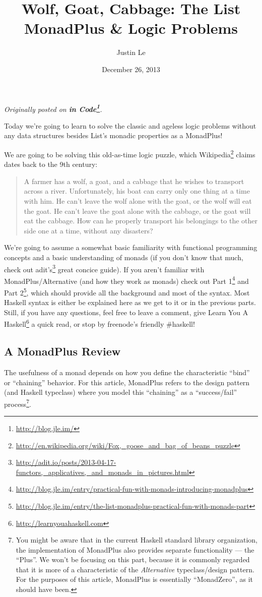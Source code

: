 \documentclass[]{article}
\title{Wolf, Goat, Cabbage: The List MonadPlus \& Logic Problems}
\author{Justin Le}
\date{December 26, 2013}
\renewcommand{\href}[2]{#2\footnote{\url{#1}}}
\begin{document}
\maketitle

\emph{Originally posted on \textbf{\href{http://blog.jle.im/}{in
Code}}.}

Today we're going to learn to solve the classic and ageless logic
problems without any data structures besides List's monadic properties
as a MonadPlus!

We are going to be solving this old-as-time logic puzzle, which
\href{http://en.wikipedia.org/wiki/Fox,_goose_and_bag_of_beans_puzzle}{Wikipedia}
claims dates back to the 9th century:

\begin{quote}
A farmer has a wolf, a goat, and a cabbage that he wishes to transport
across a river. Unfortunately, his boat can carry only one thing at a
time with him. He can't leave the wolf alone with the goat, or the wolf
will eat the goat. He can't leave the goat alone with the cabbage, or
the goat will eat the cabbage. How can he properly transport his
belongings to the other side one at a time, without any disasters?
\end{quote}

We're going to assume a somewhat basic familiarity with functional
programming concepts and a basic understanding of monads (if you don't
know that much, check out
\href{http://adit.io/posts/2013-04-17-functors,_applicatives,_and_monads_in_pictures.html}{adit's}
great concice guide). If you aren't familiar with MonadPlus/Alternative
(and how they work as monads) check out
\href{http://blog.jle.im/entry/practical-fun-with-monads-introducing-monadplus}{Part
1} and
\href{http://blog.jle.im/entry/the-list-monadplus-practical-fun-with-monads-part}{Part
2}, which should provide all the background and most of the syntax. Most
Haskell syntax is either be explained here as we get to it or in the
previous parts. Still, if you have any questions, feel free to leave a
comment, give \href{http://learnyouahaskell.com}{Learn You A Haskell} a
quick read, or stop by freenode's friendly \#haskell!

\subsection{A MonadPlus Review}\label{a-monadplus-review}

The usefulness of a monad depends on how you define the characteristic
``bind'' or ``chaining'' behavior. For this article, MonadPlus refers to
the design pattern (and Haskell typeclass) where you model this
``chaining'' as a ``success/fail'' process\footnote{You might be aware
  that in the current Haskell standard library organization, the
  implementation of MonadPlus also provides separate functionality ---
  the ``Plus''. We won't be focusing on this part, because it is
  commonly regarded that it is more of a characteristic of the
  \emph{Alternative} typeclass/design pattern. For the purposes of this
  article, MonadPlus is essentially ``MonadZero'', as it should have
  been.}.
\end{document}
